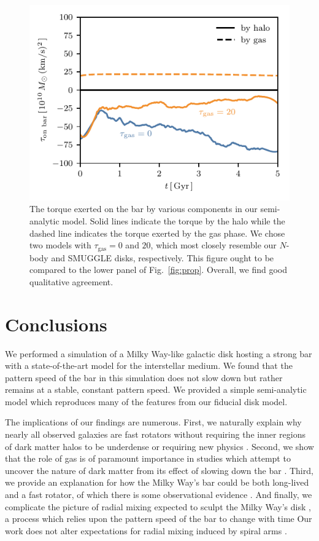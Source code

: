 \documentclass[twocolumn,linenumbers]{aastex631}
\newcommand{\SMUGGLE}{SMUGGLE}
\begin{document}
\begin{figure}
    \centering
    \includegraphics[width=\columnwidth]{fig/sam_torque.pdf}
    \caption{The torque exerted on the bar by various components in our
    semi-analytic model. Solid lines indicate the torque by the halo while the
    dashed line indicates the torque exerted by the gas phase. We chose two
    models with $\tau_{\textrm{gas}}=0$ and $20$, which most closely resemble
    our $N$-body and \SMUGGLE{} disks, respectively. This figure ought to be
    compared to the lower panel of Fig.~\ref{fig:prop}. Overall, we find good
    qualitative agreement.}
    \label{fig:sam-torque}
\end{figure}

\section{Conclusions}
\label{sec:conclusions}
We performed a simulation of a Milky Way-like galactic disk hosting a strong bar
with a state-of-the-art model for the interstellar medium. We found that the
pattern speed of the bar in this simulation does not slow down but rather
remains at a stable, constant pattern speed. We provided a simple semi-analytic
model which reproduces many of the features from our fiducial disk model.

The implications of our findings are numerous. First, we naturally explain why
nearly all observed galaxies are fast rotators without requiring the inner
regions of dark matter halos to be underdense \citep{1998ApJ...493L...5D,
2000ApJ...543..704D} or requiring new physics \citep{2021MNRAS.503.2833R,
2021MNRAS.508..926R}. Second, we show that the role of gas is of paramount
importance in studies which attempt to uncover the nature of dark matter from
its effect of slowing down the bar \citep{2021MNRAS.500.4710C,
2021MNRAS.505.2412C}. Third, we provide an explanation for how the Milky Way's
bar could be both long-lived and a fast rotator, of which there is some
observational evidence \citep{2019MNRAS.490.4740B}. And finally, we complicate
the picture of radial mixing expected to sculpt the Milky Way's disk
\citep{2012MNRAS.420..913B, 2015ApJ...808..132H}, a process which relies upon
the pattern speed of the bar to change with time Our work does not alter
expectations for radial mixing induced by spiral arms
\citep{2002MNRAS.336..785S}.
\end{document}
